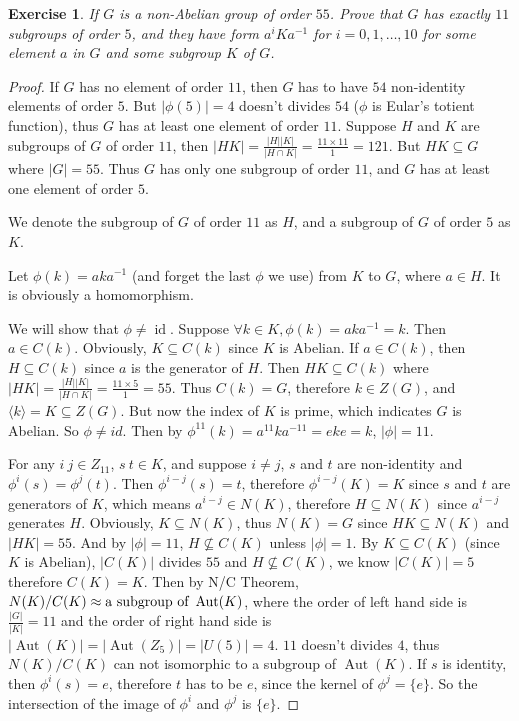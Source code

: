 \documentclass[14pt]{extarticle}
\newtheorem{exercise}{Exercise}[section]
\newcommand{\inv}[1]{#1^{-1}}
\newcommand{\1}{\{ e \}}
\newcommand{\cyc}[1]{\langle #1 \rangle}
\DeclareMathOperator{\Aut}{Aut}
\DeclareMathOperator{\id}{id}
\begin{document}
\begin{exercise}
  If $G$ is a non-Abelian group of order $55$. 
  Prove that $G$ has exactly $11$ subgroups of order $5$,
  and they have form $a^iKa^{-1}$ for $i = 0, 1, \dots, 10$
  for some element $a$ in $G$ and some subgroup $K$ of $G$.
\end{exercise}
\begin{proof}
  If $G$ has no element of order $11$, 
  then $G$ has to have $54$ non-identity elements of order $5$.
  But $|\phi(5)| = 4$ doesn't divides $54$ ($\phi$ is Eular's totient function),
  thus $G$ has at least one element of order $11$.
  Suppose $H$ and $K$ are subgroups of $G$ of order $11$,
  then $\displaystyle |HK| = \frac{|H||K|}{|H \cap K|} = \frac{11 \times 11}{1} = 121$.
  But $HK \subseteq G$ where $|G| = 55$.
  Thus $G$ has only one subgroup of order $11$, 
  and $G$ has at least one element of order $5$.

  We denote the subgroup of $G$ of order $11$ as $H$,
  and a subgroup of $G$ of order $5$ as $K$.

  Let $\phi(k) = ak\inv{a}$ (and forget the last $\phi$ we use) from $K$ to $G$, where $a \in H$.
  It is obviously a homomorphism.

  We will show that $\phi \neq \id$. Suppose $\forall k \in K, \phi(k) = ak\inv{a} = k$.
  Then $a \in C(k)$.
  Obviously, $K \subseteq C(k)$ since $K$ is Abelian.
  If $a \in C(k)$, then $H \subseteq C(k)$ 
  since $a$ is the generator of $H$.
  Then $HK \subseteq C(k)$ 
  where $\displaystyle |HK| = \frac{|H||K|}{|H \cap K|} = \frac{11 \times 5}{1} = 55$.
  Thus $C(k) = G$, therefore $k \in Z(G)$, and $\cyc{k} = K \subseteq Z(G)$.
  But now the index of $K$ is prime, which indicates $G$ is Abelian.
  So $\phi \neq id$.
  Then by $\phi^{11}(k) = a^{11}ka^{-11} = eke = k$, $|\phi| = 11$.

  For any $i \ j \in Z_{11}$, $s \ t \in K$, and suppose $i \neq j$, $s$ and $t$ are non-identity and $\phi^i(s) = \phi^j(t)$.
  Then $\phi^{i - j}(s) = t$, therefore $\phi^{i - j}(K) = K$ since $s$ and $t$ are generators of $K$,
  which means $a^{i - j} \in N(K)$, therefore $H \subseteq N(K)$ 
  since $a^{i - j}$ generates $H$.
  Obviously, $K \subseteq N(K)$, thus $N(K) = G$ since $HK \subseteq N(K)$ and $|HK| = 55$.
  And by $|\phi| = 11$, $H \nsubseteq C(K)$ unless $|\phi| = 1$.
  By $K \subseteq C(K)$ (since $K$ is Abelian), $|C(K)|$ divides $55$
  and $H \nsubseteq C(K)$, we know $|C(K)| = 5$ therefore $C(K) = K$.
  Then by N/C Theorem, $N(K)/C(K) \approx \textnormal{a subgroup of } \Aut(K)$,
  where the order of left hand side is $\frac{|G|}{|K|} = 11$
  and the order of right hand side is $|\Aut(K)| = |\Aut(Z_5)| = |U(5)| = 4$.
  $11$ doesn't divides $4$, thus $N(K)/C(K)$ can not isomorphic to a subgroup of $\Aut(K)$.
  If $s$ is identity, then $\phi^i(s) = e$, therefore $t$ has to be $e$,
  since the kernel of $\phi^j = \1$.
  So the intersection of the image of $\phi^i$ and $\phi^j$ is $\1$.


\end{proof}
\end{document}

